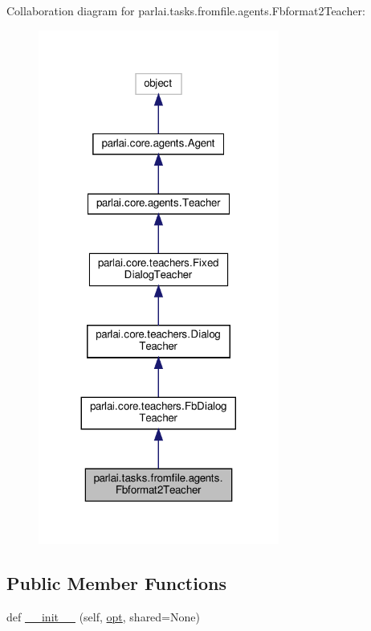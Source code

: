 Collaboration diagram for parlai.\+tasks.\+fromfile.\+agents.\+Fbformat2\+Teacher\+:
\nopagebreak
\begin{figure}[H]
\begin{center}
\leavevmode
\includegraphics[width=224pt]{d5/d9e/classparlai_1_1tasks_1_1fromfile_1_1agents_1_1Fbformat2Teacher__coll__graph}
\end{center}
\end{figure}
\subsection*{Public Member Functions}
\begin{DoxyCompactItemize}
\item 
def \hyperlink{classparlai_1_1tasks_1_1fromfile_1_1agents_1_1Fbformat2Teacher_ab1420f53e945bfec70105e1e90f62580}{\+\_\+\+\_\+init\+\_\+\+\_\+} (self, \hyperlink{classparlai_1_1core_1_1teachers_1_1FbDialogTeacher_af7a9ec497b9cd0292d7b8fa220da7c28}{opt}, shared=None)
\end{DoxyCompactItemize}
